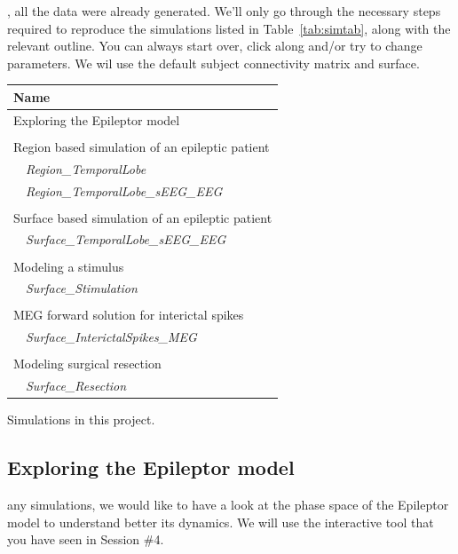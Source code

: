 \documentclass{tufte-handout}
\begin{document}
, all the data were already generated. We'll only go through the necessary steps 
required to reproduce the simulations listed in Table~\ref{tab:simtab}, along with the relevant outline.
You can always start over, click along and/or try to change parameters.
We wil use the default subject connectivity matrix and surface.


\begin{margintable}
  \centering
  \selectfont
  \begin{tabular}{l}
    \toprule
    Name \\
    \midrule
    Exploring the Epileptor model\\
    \\
    Region based simulation of an epileptic patient \\
    $\quad$\textit{Region\_TemporalLobe} \\
    $\quad$\textit{Region\_TemporalLobe\_sEEG\_EEG}  \\
    \\
    Surface based simulation of an epileptic patient \\
    $\quad$\textit{Surface\_TemporalLobe\_sEEG\_EEG}  \\
    \\
    Modeling a stimulus \\
    $\quad$\textit{Surface\_Stimulation}  \\ 
    \\
    MEG forward solution for interictal spikes \\
    $\quad$\textit{Surface\_InterictalSpikes\_MEG} \\
    \\
    Modeling surgical resection\\
    $\quad$\textit{Surface\_Resection} \\
    \bottomrule
  \end{tabular}
  \caption{Simulations in this project.}
  \label{tab:simtab}
\end{margintable}


\subsection{Exploring the Epileptor model}\label{sec:epileptor}


 any simulations, we would like to have a look at the phase space of the Epileptor model
to understand better its dynamics. We will use the interactive tool that you have seen in Session \#4.
\end{document}
